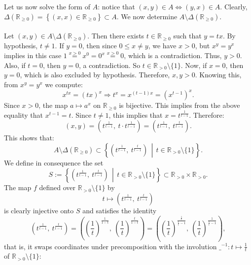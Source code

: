 \documentclass[11pt, a4paper, oneside]{article}
\theoremstyle{remark}
\theoremstyle{lemma}
\begin{document}
\\\\
Let us now solve the form of \(A\): notice that \((x,y) \in A \Leftrightarrow (y,x) \in A\). Clearly, \(\Delta\left( \mathbb{R}_{\geq 0} \right) = \left\{ \left( x,x \right) \in \mathbb{R}_{\geq 0} \right\} \subset A\). We now determine \(A \setminus \Delta\left( \mathbb{R}_{\geq 0} \right)\).
\\\\
Let \((x,y) \in A \setminus \Delta\left( \mathbb{R}_{\geq 0} \right)\). Then there exists \(t \in \mathbb{R}_{\geq 0}\) such that \(y = t x\). By hypothesis, \(t \neq 1\). If \(y = 0\), then since \(0 \leq x \neq y\), we have \(x > 0\), but \(x^y = y^x\) implies in this case \(1 \overset{x > 0}{=} x^0 = 0^x \overset{x > 0}{=} 0\), which is a contradiction. Thus, \(y > 0\). Also, if \(t = 0\), then \(y = 0\), a contradiction. So \(t \in \mathbb{R}_{>0} \setminus \{1\}\). Now, if \(x = 0\), then \(y = 0\), which is also excluded by hypothesis. Therefore, \(x, y > 0\). Knowing this, from \(x^y = y^x\) we compute:
\[
x^{t x} = (t x)^x \Rightarrow t^x = x^{(t - 1)x} = \left(x^{t - 1}\right)^x.
\]
Since \(x > 0\), the map \(a \mapsto a^x\) on \(\mathbb{R}_{\geq 0}\) is bijective. This implies from the above equality that \(x^{t - 1} = t\). Since \(t \neq 1\), this implies that \(x = t^{\frac{1}{t - 1}}\). Therefore:
\[
(x,y) = \left(t^{\frac{1}{t - 1}},\ t \cdot t^{\frac{1}{t - 1}}\right) = \left(t^{\frac{1}{t - 1}},\ t^{\frac{t}{t - 1}}\right).
\]
This shows that:
\[
A \setminus \Delta\left(\mathbb{R}_{\geq 0}\right) \subset \left\{ \left(t^{\frac{1}{t - 1}},\ t^{\frac{t}{t - 1}} \right) \,\middle|\, t \in \mathbb{R}_{> 0} \setminus \{1\} \right\}.
\]
We define in consequence the set
\[
S := \left\{ \left(t^{\frac{1}{t - 1}},\ t^{\frac{t}{t - 1}} \right) \,\middle|\, t \in \mathbb{R}_{>0} \setminus \{1\} \right\} \subset \mathbb{R}_{> 0} \times \mathbb{R}_{> 0}.
\]
The map $f$ defined over \( \mathbb{R}_{>0} \setminus \{1\} \) by
\[
t \mapsto \left(t^{\frac{1}{t - 1}},\ t^{\frac{t}{t - 1}} \right)
\]
is clearly injective onto \(S\) and satisfies the identity
\[
\left(t^{\frac{1}{t - 1}},\ t^{\frac{t}{t - 1}} \right) = \left(\left( \frac{1}{t} \right)^{\frac{1}{1 - t}},\ \left( \frac{1}{t} \right)^{\frac{t}{1 - t}} \right)
= \left( \left( \frac{1}{t} \right)^{\frac{\frac{1}{t}}{\frac{1}{t} - 1}},\ \left( \frac{1}{t} \right)^{\frac{1}{\frac{1}{t} - 1}} \right),
\]
that is, it swaps coordinates under precomposition with the involution \(\_^{-1}: t \mapsto \frac{1}{t}\) of \(\mathbb{R}_{>0} \setminus \{1\}\): 
\end{document}
